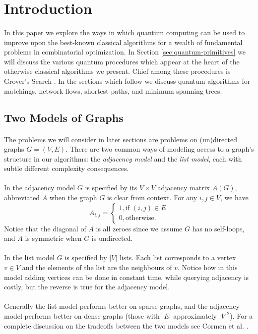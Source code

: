 \section{Introduction}
\paragraph{}
In this paper we explore the ways in which quantum computing can be used to improve upon the best-known classical algorithms for a wealth of fundamental problems in combinatorial optimization. In Section \ref{sec:quantum-primitives} we will discuss the various quantum procedures which appear at the heart of the otherwise classical algorithms we present. Chief among these procedures is Grover's Search \cite{grover1996fast}. In the sections which follow we discuss quantum algorithms for matchings, network flows, shortest paths, and minimum spanning trees.
\subsection{Two Models of Graphs}
\paragraph{}
The problems we will consider in later sections are problems on (un)directed graphs $G=(V,E)$. There are two common ways of modeling access to a graph's structure in our algorithms: the {\it adjacency model} and the {\it list model}, each with subtle different complexity consequences.
\paragraph{}
In the adjacency model $G$ is specified by its $V \times V$ adjacency matrix $A(G)$, abbreviated $A$ when the graph $G$ is clear from context. For any $i, j \in V$, we have
$$A_{i,j} = \begin{cases}
1, \text{if $(i,j) \in E$}\\
0, \text{otherwise.}
\end{cases}$$
Notice that the diagonal of $A$ is all zeroes since we assume $G$ has no self-loops, and $A$ is symmetric when $G$ is undirected.
\paragraph{}
In the list model $G$ is specified by $|V|$ lists. Each list corresponds to a vertex $v \in V$ and the elements of the list are the neighbours of $v$. Notice how in this model adding vertices can be done in constant time, while querying adjacency is costly, but the reverse is true for the adjacency model.
\paragraph{}
Generally the list model performs better on sparse graphs, and the adjacency model performs better on dense graphs (those with $|E|$ approximately $|V|^2$). For a complete discussion on the tradeoffs between the two models see Cormen et al. \cite[pages 529-530]{cormen2009introduction}.